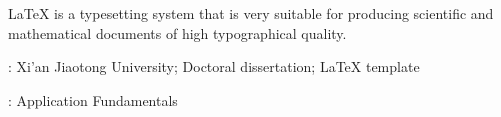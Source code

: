 \noindent \LaTeX{} is a typesetting system that is very suitable for producing scientific and mathematical documents of high typographical quality.


\vspace{\baselineskip}
: Xi'an Jiaotong University; Doctoral dissertation; \LaTeX{} template

\vspace{\baselineskip}
: Application Fundamentals

\clearpage{\pagestyle{empty}\cleardoublepage}%
